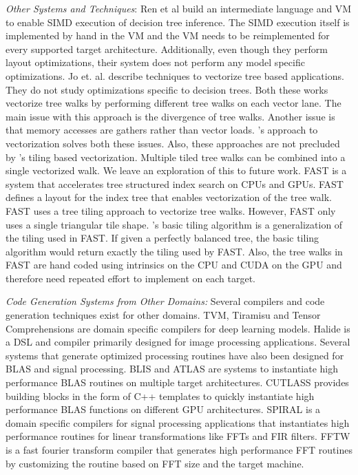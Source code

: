 \emph{Other Systems and Techniques}: 
Ren et al \cite{PortableVM} build an intermediate language and VM to 
enable SIMD execution of decision tree inference. The SIMD execution itself is implemented 
by hand in the VM and the VM needs to be reimplemented for every supported target architecture.
Additionally, even though they perform layout optimizations, their system does not perform 
any model specific optimizations. Jo et. al.\cite{MilindTreeVectorization} describe techniques 
to vectorize tree based applications. They do not study optimizations specific to decision trees.
Both these works vectorize tree walks by performing different tree walks on each vector lane.
The main issue with this approach is the divergence of tree walks. Another issue is that 
memory accesses are gathers rather than vector loads. \Treebeard{}'s approach to 
vectorization solves both these issues. Also, these approaches are not precluded 
by \Treebeard{}'s tiling based vectorization. Multiple tiled tree walks can be combined
into a single vectorized walk. We leave an exploration of this to future work. 
FAST\cite{FAST} is a system that accelerates tree structured index search 
on CPUs and GPUs. FAST defines a layout for the index tree that enables vectorization 
of the tree walk. FAST uses a tree tiling approach to vectorize tree walks. However, 
FAST only uses a single triangular tile shape. \Treebeard{}'s basic tiling algorithm 
is a generalization of the tiling used in FAST. If given a perfectly balanced tree,
the basic tiling algorithm would return exactly the tiling used by FAST. 
Also, the tree walks in FAST are hand coded using intrinsics on the CPU and CUDA 
on the GPU and therefore need repeated effort to implement on each target. 

\emph{Code Generation Systems from Other Domains:}
Several compilers and code generation techniques exist for other domains.
TVM\cite{TVM}, Tiramisu\cite{Tiramisu} and Tensor 
Comprehensions\cite{TensorComprehensions} are domain specific compilers 
for deep learning models. Halide\cite{Halide} is a DSL and compiler 
primarily designed for image processing applications. Several systems
that generate optimized processing routines have also been designed 
for BLAS and signal processing. BLIS\cite{BLIS} and ATLAS\cite{atlas_sc98}
are systems to instantiate high performance BLAS routines on multiple 
target architectures. CUTLASS\cite{CUTLASS} provides building blocks 
in the form of C++ templates to quickly instantiate high performance 
BLAS functions on different GPU architectures. SPIRAL\cite{SPIRAL}
is a domain specific compilers for signal processing applications
that instantiates high performance routines for linear transformations 
like FFTs and FIR filters. FFTW\cite{FFTW} is a fast fourier transform 
compiler that generates high performance FFT routines by customizing 
the routine based on FFT size and the target machine.
